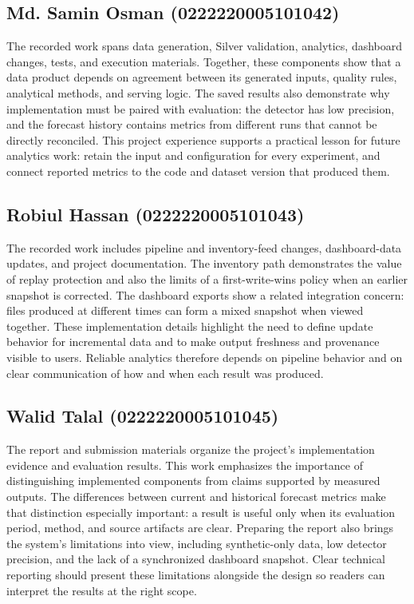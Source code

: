 \documentclass[conference]{IEEEtran}
\begin{document}
\subsection*{Md. Samin Osman (0222220005101042)}
The recorded work spans data generation, Silver validation, analytics, dashboard changes, tests, and execution materials. Together, these components show that a data product depends on agreement between its generated inputs, quality rules, analytical methods, and serving logic. The saved results also demonstrate why implementation must be paired with evaluation: the detector has low precision, and the forecast history contains metrics from different runs that cannot be directly reconciled. This project experience supports a practical lesson for future analytics work: retain the input and configuration for every experiment, and connect reported metrics to the code and dataset version that produced them.

\subsection*{Robiul Hassan (0222220005101043)}
The recorded work includes pipeline and inventory-feed changes, dashboard-data updates, and project documentation. The inventory path demonstrates the value of replay protection and also the limits of a first-write-wins policy when an earlier snapshot is corrected. The dashboard exports show a related integration concern: files produced at different times can form a mixed snapshot when viewed together. These implementation details highlight the need to define update behavior for incremental data and to make output freshness and provenance visible to users. Reliable analytics therefore depends on pipeline behavior and on clear communication of how and when each result was produced.

\subsection*{Walid Talal (0222220005101045)}
The report and submission materials organize the project's implementation evidence and evaluation results. This work emphasizes the importance of distinguishing implemented components from claims supported by measured outputs. The differences between current and historical forecast metrics make that distinction especially important: a result is useful only when its evaluation period, method, and source artifacts are clear. Preparing the report also brings the system's limitations into view, including synthetic-only data, low detector precision, and the lack of a synchronized dashboard snapshot. Clear technical reporting should present these limitations alongside the design so readers can interpret the results at the right scope.
\end{document}

